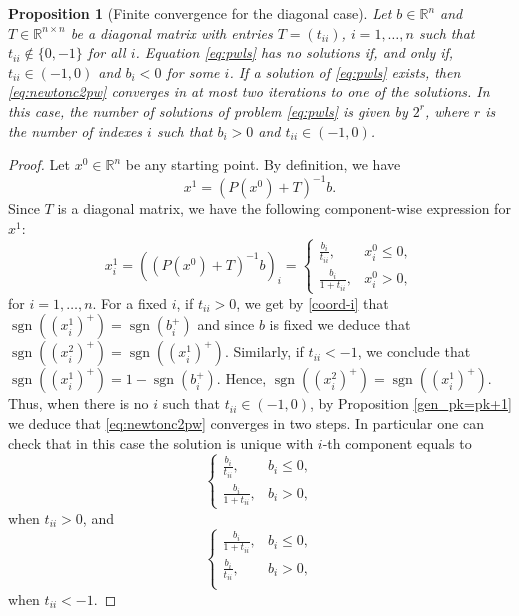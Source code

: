 \documentclass[11pt]{article}
\newtheorem{proposition}{Proposition}[section]
\DeclareMathOperator{\sgn}{sgn}
\newcommand{\R}{\mathbb R}
\begin{document}
\begin{proposition}[Finite convergence for the diagonal case]\label{diag_case}
Let $b \in \R^n$ and $T\in\R^{n\times n}$ be a diagonal matrix with entries $T = (t_{ii})$, $i=1,\dots,n$ such that $t_{ii} \notin \{0,-1\}$ for all $i$. Equation \eqref{eq:pwls} has no solutions if, and only if, $t_{ii}\in(-1,0)$ and $b_i<0$ for some $i$. If a solution of \eqref{eq:pwls} exists, then \eqref{eq:newtonc2pw} converges in at most two iterations to one of the solutions. In this case, the number of solutions of problem \eqref{eq:pwls} is given by $2^r$, where $r$ is the number of indexes $i$ such that $b_i>0$ and $t_{ii}\in(-1,0)$.
\end{proposition}

\begin{proof}
Let $x^0 \in \R^n$ be any starting point. By definition, we have
$$ x^1 = (P(x^0) + T)^{-1}b.$$ Since $T$ is a diagonal matrix, we have the following component-wise expression for $x^1$:
\begin{equation}\label{coord-i}
x^1_i = ((P(x^0) + T)^{-1}b)_i =
\begin{cases}
 \frac{b_i}{t_{ii}}, & x^0_i \leq 0, \\ 
 \frac{b_i}{1+t_{ii}}, & x^0_i > 0,    \end{cases}
\end{equation} for $i=1,\dots,n$. 
For a fixed $i$, if $t_{ii} > 0$, we get by \eqref{coord-i} that $\sgn((x^1_i)^+) = \sgn(b_i^+)$ and since $b$ is fixed we deduce that $\sgn((x^2_i)^+) = \sgn((x^1_i)^+)$. Similarly, if $t_{ii}<-1$, we conclude that $\sgn((x^1_i)^+)=1-\sgn(b_i^+)$. Hence, $\sgn((x^2_i)^+) = \sgn((x^1_i)^+)$. Thus, when there is no $i$ such that $t_{ii}\in(-1,0)$, by Proposition \ref{gen_pk=pk+1} we deduce that \eqref{eq:newtonc2pw} converges in two steps. In particular one can check that in this case the solution is unique with $i$-th component equals to 
\[ \left\{
\begin{matrix} 
      \frac{b_i}{t_{ii}}, & b_i \leq 0, \\
      \frac{b_i}{1+t_{ii}}, & b_i > 0,
   \end{matrix}\right.
\]
when $t_{ii}>0$, and
\[
\begin{cases}
\frac{b_i}{1+t_{ii}} ,& b_i \leq 0,\\
\frac{b_i}{t_{ii}} ,& b_i > 0,\\
\end{cases}%
\]
when $t_{ii} < -1$.


\end{proof}
\end{document}
